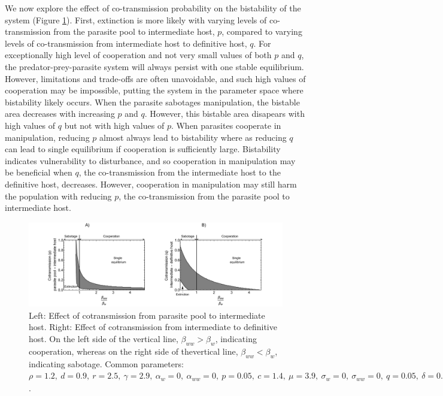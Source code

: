 \documentclass[a4paper]{scrartcl}
\begin{document}
We now explore the effect of co-transmission probability on the bistability of the system (Figure \ref{fig:contransmission}). 
First, extinction is more likely with varying levels of co-transmission from the parasite pool to intermediate host, $p$, compared to varying levels of co-transmission from intermediate host to definitive host, $q$. 
For exceptionally high level of cooperation and not very small  values of both $p$ and $q$, the predator-prey-parasite system will always persist with one stable equilibrium.
However, limitations and trade-offs are often unavoidable, and such high values of cooperation may be impossible, putting the system in the parameter space where bistability likely occurs.
When the parasite sabotages manipulation, the bistable area decreases with increasing $p$ and $q$. 
However, this bistable area disapears with high values of $q$ but not with high values of $p$. 
When parasites cooperate in manipulation, reducing $p$ almost always lead to bistability where as reducing $q$ can lead to single equilibrium if cooperation is sufficiently large.  
Bistability indicates vulnerability to disturbance, and so cooperation in manipulation may be beneficial when $q$, the co-transmission from the intermediate host to the definitive host, decreases. 
However, cooperation in manipulation may still harm the population with reducing $p$, the co-transmission from the parasite pool to intermediate host.

\begin{figure}[!ht]
	\captionsetup{format=plain}
	\centering
	\includegraphics[width=\textwidth]{Figures/coinfect_transmission.pdf}
	\caption{Left: Effect of cotransmission from parasite pool to intermediate host. Right: Effect of cotransmission from intermediate to definitive host. On the left side of the vertical line, $\beta_{ww} > \beta_{w}$, indicating cooperation, whereas on the right side of thevertical line, $\beta_{ww} < \beta_{w}$, indicating sabotage. Common parameters:  $\rho = 1.2, \ d = 0.9, \ r = 2.5, \ \gamma = 2.9, \ \alpha_w = 0, \ \alpha_{ww} = 0, \ p = 0.05, \ c = 1.4, \ \mu = 3.9, \ \sigma_w = 0, \ \sigma_{ww} = 0, \ q = 0.05, \ \delta = 0.9, \ k = 0.26, \ \epsilon = 4.5, \ \beta_w = 1.45, \ f_w = 38, \ h = 0.6$.}
	\label{fig:contransmission}
\end{figure}
\end{document}
